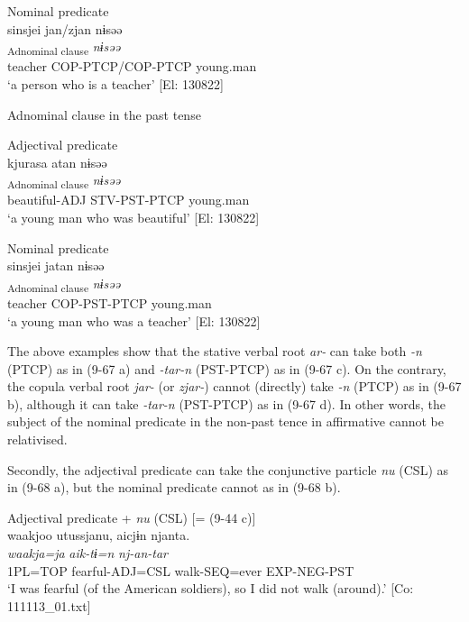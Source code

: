 \ex Nominal predicate\\
 \glll  *{\textbar}sinsjei{\textbar}  jan/zjan  nɨsəə\\
    [\textit{sinsjei}  \textit{jar-n}/\textit{zjar-n}]\textsubscript{Adnominal clause}  \textit{nɨsəə}\\
    teacher  COP-PTCP/COP-PTCP  young.man\\
     ‘a person who is a teacher’ [El: 130822]

\exi{} Adnominal clause in the past tense

\ex Adjectival predicate\\
 \glll  kjurasa  atan  nɨsəə\\
    [\textit{kjura-sa}  \textit{ar-tar-n}]\textsubscript{Adnominal clause}  \textit{nɨsəə}\\
    beautiful-ADJ  STV-PST-PTCP  young.man\\
    \glt     ‘a young man who was beautiful’ [El: 130822]

\ex Nominal predicate\\
 \glll  {\textbar}sinsjei{\textbar}  jatan  nɨsəə\\
    [\textit{sinsjei}  \textit{jar-tar-n}]\textsubscript{Adnominal clause}  \textit{nɨsəə}\\
    teacher  COP-PST-PTCP  young.man\\
    \glt      ‘a young man who was a teacher’ [El: 130822]
    \z
\z

The above examples show that the stative verbal root \textit{ar-} can take both \textit{{}-n} (PTCP) as in (9-67 a) and \textit{{}-tar-n} (PST-PTCP) as in (9-67 c). On the contrary, the copula verbal root \textit{jar-} (or \textit{zjar-}) cannot (directly) take \textit{{}-n} (PTCP) as in (9-67 b), although it can take \textit{{}-tar-n} (PST-PTCP) as in (9-67 d). In other words, the subject of the nominal predicate in the non-past tence in affirmative cannot be relativised.

Secondly, the adjectival predicate can take the conjunctive particle \textit{nu} (CSL) as in (9-68 a), but the nominal predicate cannot as in (9-68 b).

\ea   \label{ex:9.68}
\ea Adjectival predicate + \textit{nu} (CSL) [= (9-44 c)]\\
 \glll  waakjoo  utussjanu,  aicjɨn  njanta.\\
    \textit{waakja=ja}  \textit{}  \textit{aik-tɨ=n}  \textit{nj-an-tar}\\
    1PL=TOP  fearful-ADJ=CSL  walk-SEQ=ever  EXP-NEG-PST\\
    \glt     ‘I was fearful (of the American soldiers), so I did not walk (around).’ [Co: 111113\_01.txt]


